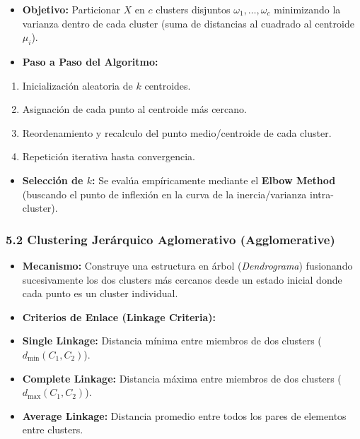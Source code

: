 \documentclass[11pt,oneside]{article}
\begin{document}
\begin{itemize}

\item \textbf{Objetivo:} Particionar \(X\) en \(c\) clusters disjuntos \(\omega_1, \dots, \omega_c\) minimizando la varianza dentro de cada cluster (suma de distancias al cuadrado al centroide \(\mu_i\)).

\item \textbf{Paso a Paso del Algoritmo:}

\end{itemize}

\begin{enumerate}

\item Inicialización aleatoria de \(k\) centroides.

\item Asignación de cada punto al centroide más cercano.

\item Reordenamiento y recalculo del punto medio/centroide de cada cluster.

\item Repetición iterativa hasta convergencia.

\end{enumerate}

\begin{itemize}

\item \textbf{Selección de \(k\):} Se evalúa empíricamente mediante el \textbf{Elbow Method} (buscando el punto de inflexión en la curva de la inercia/varianza intra-cluster).

\end{itemize}

\subsubsection{5.2 Clustering Jerárquico Aglomerativo (Agglomerative)}

\begin{itemize}

\item \textbf{Mecanismo:} Construye una estructura en árbol (\emph{Dendrograma}) fusionando sucesivamente los dos clusters más cercanos desde un estado inicial donde cada punto es un cluster individual.

\item \textbf{Criterios de Enlace (Linkage Criteria):}

\item \textbf{Single Linkage:} Distancia mínima entre miembros de dos clusters (\(d_{\min}(C_1, C_2)\)).

\item \textbf{Complete Linkage:} Distancia máxima entre miembros de dos clusters (\(d_{\max}(C_1, C_2)\)).

\item \textbf{Average Linkage:} Distancia promedio entre todos los pares de elementos entre clusters.

\end{itemize}
\end{document}
